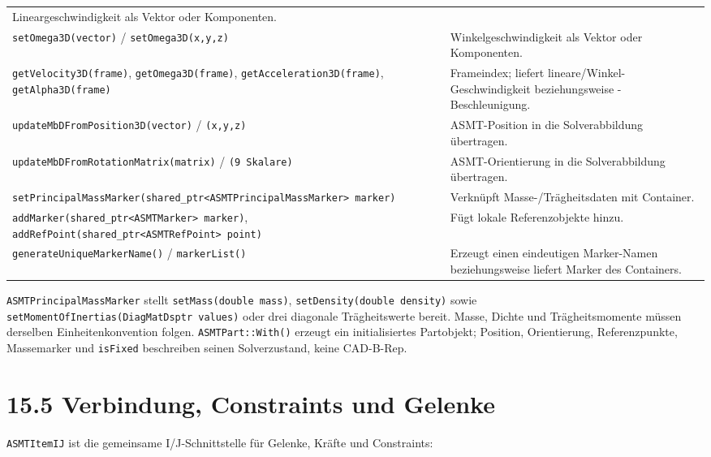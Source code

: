 \documentclass[
  12pt
]{book}
\begin{document}
\begin{longtable}[]{@{}
  >{\raggedright\arraybackslash}p{}
  >{\raggedright\arraybackslash}p{}@{}}
Lineargeschwindigkeit als Vektor oder Komponenten. \\
\texttt{setOmega3D(vector)} / \texttt{setOmega3D(x,y,z)} &
Winkelgeschwindigkeit als Vektor oder Komponenten. \\
\texttt{getVelocity3D(frame)}, \texttt{getOmega3D(frame)},
\texttt{getAcceleration3D(frame)}, \texttt{getAlpha3D(frame)} &
Frameindex; liefert lineare/Winkel-Geschwindigkeit beziehungsweise
-Beschleunigung. \\
\texttt{updateMbDFromPosition3D(vector)} / \texttt{(x,y,z)} &
ASMT-Position in die Solverabbildung übertragen. \\
\texttt{updateMbDFromRotationMatrix(matrix)} / \texttt{(9\ Skalare)} &
ASMT-Orientierung in die Solverabbildung übertragen. \\
\texttt{setPrincipalMassMarker(shared\_ptr\textless{}ASMTPrincipalMassMarker\textgreater{}\ marker)}
& Verknüpft Masse-/Trägheitsdaten mit Container. \\
\texttt{addMarker(shared\_ptr\textless{}ASMTMarker\textgreater{}\ marker)},
\texttt{addRefPoint(shared\_ptr\textless{}ASMTRefPoint\textgreater{}\ point)}
& Fügt lokale Referenzobjekte hinzu. \\
\texttt{generateUniqueMarkerName()} / \texttt{markerList()} & Erzeugt
einen eindeutigen Marker-Namen beziehungsweise liefert Marker des
Containers. \\
\end{longtable}

\texttt{ASMTPrincipalMassMarker} stellt \texttt{setMass(double\ mass)},
\texttt{setDensity(double\ density)} sowie
\texttt{setMomentOfInertias(DiagMatDsptr\ values)} oder drei diagonale
Trägheitswerte bereit. Masse, Dichte und Trägheitsmomente müssen
derselben Einheitenkonvention folgen. \texttt{ASMTPart::With()} erzeugt
ein initialisiertes Partobjekt; Position, Orientierung, Referenzpunkte,
Massemarker und \texttt{isFixed} beschreiben seinen Solverzustand, keine
CAD-B-Rep.

\hypertarget{verbindung-constraints-und-gelenke}{%
\section{\texorpdfstring{{15.5} Verbindung, Constraints und
Gelenke}{15.5 Verbindung, Constraints und Gelenke}}\label{verbindung-constraints-und-gelenke}}

\texttt{ASMTItemIJ} ist die gemeinsame I/J-Schnittstelle für Gelenke,
Kräfte und Constraints:
\end{document}
